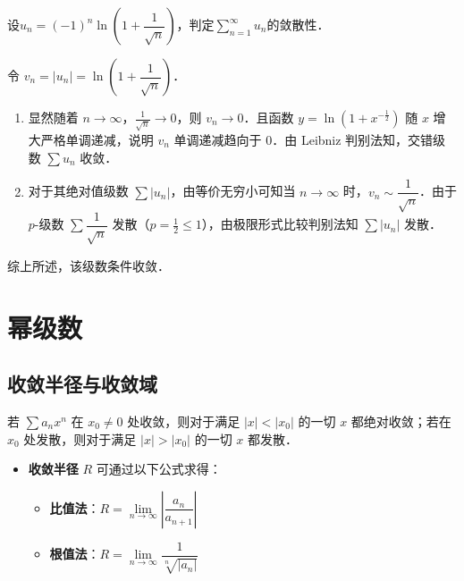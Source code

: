\documentclass[12pt, a4paper, oneside, UTF8]{ctexbook}
\begin{document}
\begin{example}
    设$u_n=(-1)^n\ln(1+\dfrac{1}{\sqrt{n}})$，判定$\displaystyle\sum_{n=1}^{\infty}u_n$的敛散性．
\end{example}
\begin{solution}
    令 $v_n = |u_n| = \ln(1+\dfrac{1}{\sqrt{n}})$．
    \begin{enumerate}
        \item 显然随着 $n \to \infty$，$\frac{1}{\sqrt{n}} \to 0$，则 $v_n \to 0$．且函数 $y = \ln(1+x^{-\frac{1}{2}})$ 随 $x$ 增大严格单调递减，说明 $v_n$ 单调递减趋向于 $0$．由 Leibniz 判别法知，交错级数 $\sum u_n$ 收敛．
        \item 对于其绝对值级数 $\sum |u_n|$，由等价无穷小可知当 $n \to \infty$ 时，$v_n \sim \dfrac{1}{\sqrt{n}}$．由于 $p$-级数 $\sum \dfrac{1}{\sqrt{n}}$ 发散（$p = \frac{1}{2} \le 1$），由极限形式比较判别法知 $\sum |u_n|$ 发散．
    \end{enumerate}
    综上所述，该级数条件收敛．
\end{solution}

\section{幂级数}
\subsection{收敛半径与收敛域}
\begin{theorem}[Abel 定理]
    若 $\sum a_n x^n$ 在 $x_0 \neq 0$ 处收敛，则对于满足 $|x| < |x_0|$ 的一切 $x$ 都绝对收敛；若在 $x_0$ 处发散，则对于满足 $|x| > |x_0|$ 的一切 $x$ 都发散．
\end{theorem}
\begin{itemize}
    \item \textbf{收敛半径} $R$ 可通过以下公式求得：
        \begin{itemize}
            \item \textbf{比值法}：$R = \lim\limits_{n \to \infty} \left| \dfrac{a_n}{a_{n+1}} \right|$
            \item \textbf{根值法}：$R = \lim\limits_{n \to \infty}\dfrac{1}{\sqrt[n]{|a_n|}}$
        \end{itemize}
\end{itemize}
\end{document}
